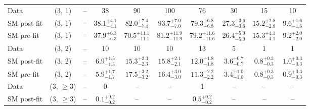 {\begin{table}[h!]
{\begin{tabular}{lccccccccc}
    Data        & (3, 1)           & --                            & 38                            & 90                          & 100                         & 76                          & 30                          & 15                         & 10                         \\[0.5ex] 
    SM post-fit & (3, 1)           & --                            & $38.1^{+ 4.1 }_{- 4.1 }$      & $82.0^{+ 7.4 }_{- 7.4 }$    & $93.7^{+ 7.0 }_{- 7.0 }$    & $79.3^{+ 6.8 }_{- 6.8 }$    & $27.3^{+ 3.6 }_{- 3.6 }$    & $15.2^{+ 2.8 }_{- 2.8 }$   & $9.6^{+ 1.6 }_{- 1.6 }$    \\[0.5ex] 
    SM pre-fit  & (3, 1)           & --                            & $37.9^{+ 6.3 }_{- 6.3 }$      & $70.5^{+ 11.1 }_{- 11.1 }$  & $81.2^{+ 11.9 }_{- 11.9 }$  & $79.2^{+ 11.6 }_{- 11.6 }$  & $26.4^{+ 5.9 }_{- 5.9 }$    & $15.3^{+ 4.1 }_{- 4.1 }$   & $9.2^{+ 2.0 }_{- 2.0 }$    \\[0.5ex] 
    Data        & (3, 2)           & --                            & 10                            & 10                          & 10                          & 13                          & 5                           & 1                          & 1                          \\[0.5ex] 
    SM post-fit & (3, 2)           & --                            & $6.9^{+ 1.5 }_{- 1.5 }$       & $15.3^{+ 2.3 }_{- 2.3 }$    & $15.8^{+ 2.1 }_{- 2.1 }$    & $12.0^{+ 1.8 }_{- 1.8 }$    & $3.6^{+ 0.7 }_{- 0.7 }$     & $0.8^{+ 0.3 }_{- 0.3 }$    & $1.0^{+ 0.3 }_{- 0.3 }$    \\[0.5ex] 
    SM pre-fit  & (3, 2)           & --                            & $5.9^{+ 1.7 }_{- 1.7 }$       & $17.5^{+ 3.2 }_{- 3.2 }$    & $16.4^{+ 3.0 }_{- 3.0 }$    & $11.3^{+ 2.2 }_{- 2.2 }$    & $3.4^{+ 1.0 }_{- 1.0 }$     & $0.8^{+ 0.3 }_{- 0.3 }$    & $0.9^{+ 0.3 }_{- 0.3 }$    \\[0.5ex] 
    Data        & (3, $\ge3$)      & --                            & 0                             & --                          & --                          & 1                           & --                          & --                         & --                         \\[0.5ex] 
    SM post-fit & (3, $\ge3$)      & --                            & $0.1^{+ 0.2 }_{- 0.2 }$       & --                          & --                          & $0.5^{+ 0.2 }_{- 0.2 }$     & --                          & --                         & --                         \\[0.5ex] 

\end{tabular}}
\end{table}}
